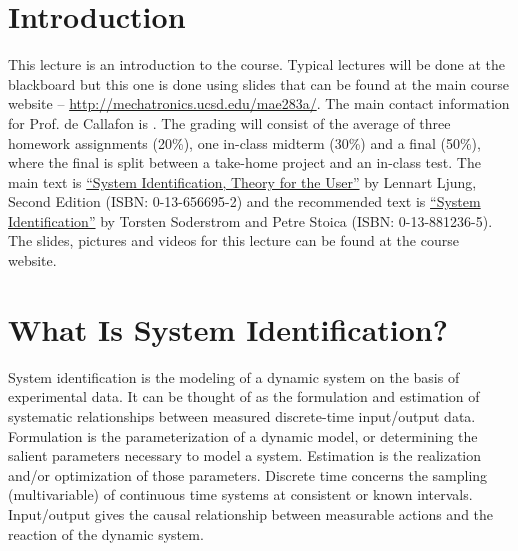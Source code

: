 
\mainmatter
\setcounter{page}{1}

\lectureseries[\course]{\course}

\date{September 24, 2009}

\setaddress

\setcounter{lecture}{0}
\setcounter{chapter}{0}


\section{Introduction}
This lecture is an introduction to the course. Typical lectures will be done at the blackboard but this one is done using slides that can be found at the main course website -- \href{http://mechatronics.ucsd.edu/mae283a/}{http://mechatronics.ucsd.edu/mae283a/}. The main contact information for Prof. de Callafon is \mailto{\authEmail}{\authEmail}. The grading will consist of the average of three homework assignments (20\%), one in-class midterm (30\%) and a final (50\%), where the final is split between a take-home project and an in-class test. The main text is \href{http://www.amazon.com/s/ref=nb\_ss?url=search-alias\%3Daps\&field-keywords=0-13-656695-2&x=0\&y=0}{``System Identification, Theory for the User''} by Lennart Ljung, Second Edition (ISBN: 0-13-656695-2) and the recommended text is \href{http://www.amazon.com/s/ref=nb\_ss?url=search-alias\%3Daps\&field-keywords=0-13-881236-5&x=0\&y=0}{``System Identification''} by Torsten Soderstrom and Petre Stoica (ISBN: 0-13-881236-5). The slides, pictures and videos for this lecture can be found at the course website.

\section{What Is System Identification?}
System identification is the modeling of a dynamic system on the basis of experimental data. It can be thought of as the formulation and estimation of systematic relationships between measured discrete-time input/output data. Formulation is the parameterization of a dynamic model, or determining the salient parameters necessary to model a system. Estimation is the realization and/or optimization of those parameters. Discrete time concerns the sampling (multivariable) of continuous time systems at consistent or known intervals. Input/output gives the causal relationship between measurable actions and the reaction of the dynamic system.

